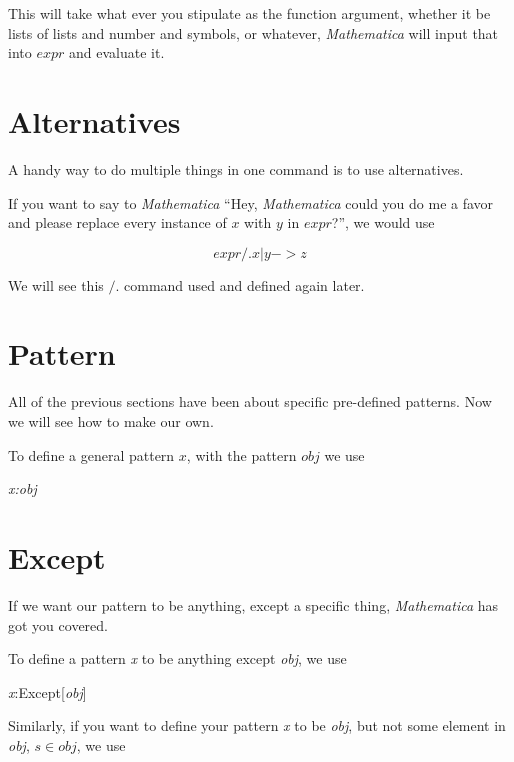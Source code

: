 \documentclass[11pt,letterpaper,twoside,titlepage]{book}
\newcommand{\Mathematica}{\textit{Mathematica} }
\begin{document}
				This will take what ever you stipulate as the function argument, whether it be lists of lists and number and symbols, or whatever, \Mathematica will input that into $expr$ and evaluate it.
				
			\section{Alternatives}
			
				A handy way to do multiple things in one command is to use alternatives.  
				
				If you want to say to \Mathematica ``Hey, \Mathematica could you do me a favor and please replace every instance of $x$ with $y$ in $expr$?'', we would use
				
				\[ expr /. x|y->z \]
				
				We will see this $/.$ command used and defined again later.
				
			\section{Pattern}
			
				All of the previous sections have been about specific pre-defined patterns.  Now we will see how to make our own.  
			
				To define a general pattern $x$, with the pattern $obj$ we use
				
				\begin{center}
				
					\emph{x:obj}
					
				\end{center}
				
			\section{Except}
			
				If we want our pattern to be anything, except a specific thing, \Mathematica has got you covered.  
				
				To define a pattern \emph{x} to be anything except \emph{obj}, we use
				
				\begin{center}
				
					\emph{x}:Except[\emph{obj}]
				
				\end{center}
				
				Similarly, if you want to define your pattern \emph{x} to be \emph{obj}, but not some element in \emph{obj}, $ s \in obj $, we use
				
\end{document}
